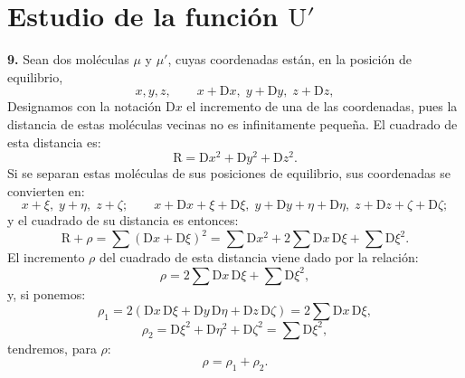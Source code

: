 \section{Estudio de la función \texorpdfstring{$\mathrm{U}'$}{U'}}

\noindent\textbf{9.} Sean dos moléculas $\mu$ y $\mu'$, cuyas coordenadas
están, en la posición de equilibrio,
\[
x,y,z,\qquad x+\mathrm{D}x,\;y+\mathrm{D}y,\;z+\mathrm{D}z,
\]
Designamos con la notación $\mathrm{D}x$ el incremento de una de las
coordenadas, pues la distancia de estas moléculas vecinas no es
infinitamente pequeña. El cuadrado de esta distancia es:
\[
\mathrm{R}=\mathrm{D}x^2+\mathrm{D}y^2+\mathrm{D}z^2.
\]
Si se separan estas moléculas de sus posiciones de equilibrio, sus
coordenadas se convierten en:
\[
x+\xi,\;y+\eta,\;z+\zeta;\qquad
x+\mathrm{D}x+\xi+\mathrm{D}\xi,\;y+\mathrm{D}y+\eta+\mathrm{D}\eta,\;
z+\mathrm{D}z+\zeta+\mathrm{D}\zeta;
\]
y el cuadrado de su distancia es entonces:
\[
\mathrm{R}+\rho=\sum(\mathrm{D}x+\mathrm{D}\xi)^2
=\sum \mathrm{D}x^2+2\sum \mathrm{D}x\,\mathrm{D}\xi+\sum \mathrm{D}\xi^2.
\]
El incremento $\rho$ del cuadrado de esta distancia viene dado por la
relación:
\[
\rho=2\sum \mathrm{D}x\,\mathrm{D}\xi+\sum \mathrm{D}\xi^2,
\]
y, si ponemos:
\begin{equation}
\rho_1=2(\mathrm{D}x\,\mathrm{D}\xi+\mathrm{D}y\,\mathrm{D}\eta+\mathrm{D}z\,\mathrm{D}\zeta)
=2\sum \mathrm{D}x\,\mathrm{D}\xi,
\tag{8}
\end{equation}
\begin{equation}
\rho_2=\mathrm{D}\xi^2+\mathrm{D}\eta^2+\mathrm{D}\zeta^2=\sum \mathrm{D}\xi^2,
\tag{9}
\end{equation}
tendremos, para $\rho$:
\begin{equation}
\rho=\rho_1+\rho_2.
\tag{10}
\end{equation}

